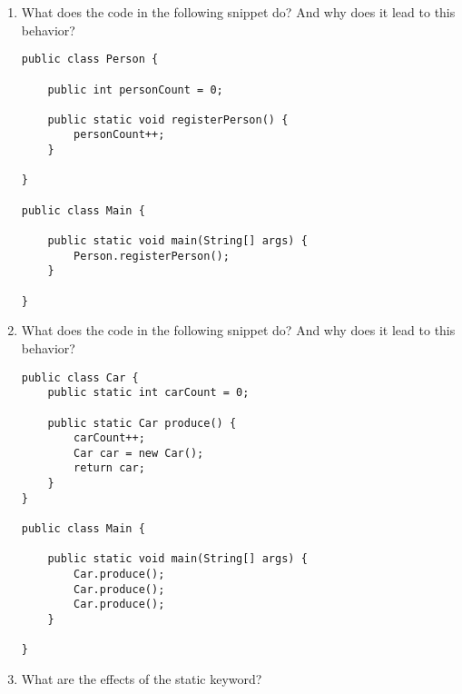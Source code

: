 \documentclass[12pt,letterpaper]{article}
\begin{document}
\begin{enumerate}
\item
What does the code in the following snippet do? And why does it lead to this behavior?
\begin{lstlisting}
public class Person {

    public int personCount = 0;

    public static void registerPerson() {
        personCount++;
    }

}

public class Main {

    public static void main(String[] args) {
        Person.registerPerson();
    }

}
\end{lstlisting}

\item
What does the code in the following snippet do? And why does it lead to this behavior?
\begin{lstlisting}
public class Car {
    public static int carCount = 0;

    public static Car produce() {
        carCount++;
        Car car = new Car();
        return car;
    }
}

public class Main {

    public static void main(String[] args) {
        Car.produce();
        Car.produce();
        Car.produce();
    }
    
}
\end{lstlisting}

\item
What are the effects of the static keyword?

\end{enumerate}
\end{document}
